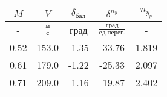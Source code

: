 \begin{tabular}{|c|c|c|c|c|}
\hline
$M$ & $V$ & $\delta_{бал}$ & $\delta^{n_y}$ & $n_{y_{p}}$ \\ 
\hline
- & $\frac{м}{с}$ & град & $\frac{град}{ед.перег.}$ & - \\ 
\hline
0.52 & 153.0 & -1.35 & -33.76 & 1.819 \\ 
\hline
0.61 & 179.0 & -1.22 & -25.33 & 2.097 \\ 
\hline
0.71 & 209.0 & -1.16 & -19.87 & 2.402 \\ 
\hline
\end{tabular}